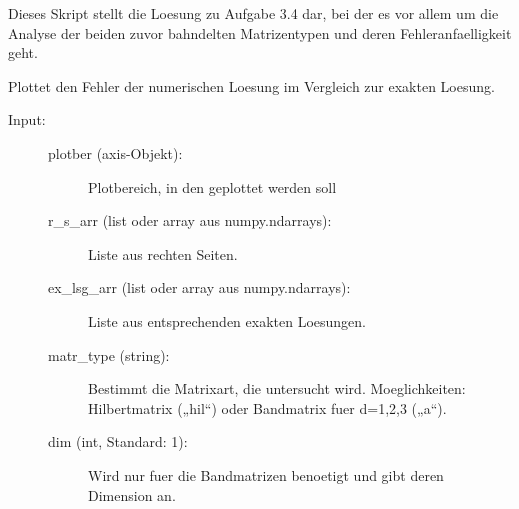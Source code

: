\documentclass[letterpaper,10pt,ngerman]{sphinxmanual}
\begin{document}
\label{\detokenize{index:module-aufg_3_4_main}}
Dieses Skript stellt die Loesung zu Aufgabe 3.4 dar, bei der es vor allem um die Analyse
der beiden zuvor bahndelten Matrizentypen und deren Fehleranfaelligkeit geht.

\begin{fulllineitems}
\label{\detokenize{index:aufg_3_4_main.plot_fehl}}
Plottet den Fehler der numerischen Loesung im Vergleich zur exakten Loesung.
\begin{description}
\item[{Input:}] \leavevmode\begin{description}
\item[{plotber (axis-Objekt):}] \leavevmode
Plotbereich, in den geplottet werden soll

\item[{r\_s\_arr (list oder array aus numpy.ndarrays):}] \leavevmode
Liste aus rechten Seiten.

\item[{ex\_lsg\_arr (list oder array aus numpy.ndarrays):}] \leavevmode
Liste aus entsprechenden exakten Loesungen.

\item[{matr\_type (string):}] \leavevmode
Bestimmt die Matrixart, die untersucht wird.
Moeglichkeiten: Hilbertmatrix („hil“) oder
Bandmatrix fuer d=1,2,3 („a“).

\item[{dim (int, Standard: 1):}] \leavevmode
Wird nur fuer die Bandmatrizen benoetigt und gibt deren Dimension an.

\end{description}

\end{description}

\end{fulllineitems}

\end{document}
